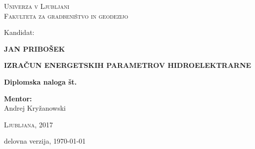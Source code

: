 \thispagestyle{empty}

\begin{minipage}{\textwidth}


\begin{center}
\vspace*{-1.5 cm}
\textsc{Univerza v Ljubljani}\\
\textsc{Fakulteta za gradbeništvo in geodezijo}

\vspace*{5cm}
Kandidat:\\
\vspace*{0.5cm}
\begin{large}
\textbf{JAN PRIBOŠEK}
\end{large}

\vspace*{1cm}

\begin{Large}
\textbf{IZRAČUN ENERGETSKIH PARAMETROV HIDROELEKTRARNE}
\end{Large}

\vspace*{1cm}

\begin{large}
\textbf{Diplomska naloga št.}
\end{large}

\end{center}
\vspace*{10cm}


\begin{large}
	\textbf{Mentor:}\\
	Andrej Kryžanowski \\
\end{large}

\begin{center}
\textsc{Ljubljana, 2017}

\vspace*{1cm}
delovna verzija, \today

\end{center}

\end{minipage}

\newpage
\thispagestyle{empty}
\cleardoublepage